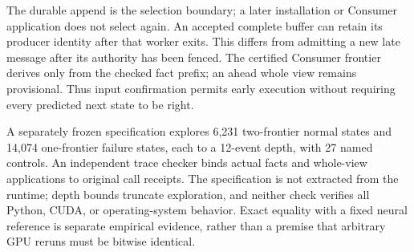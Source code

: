The durable append is the selection boundary; a later installation or
Consumer application does not select again. An accepted complete buffer
can retain its producer identity after that worker exits. This differs
from admitting a new late message after its authority has been fenced.
The certified Consumer frontier derives only from the checked fact prefix;
an ahead whole view remains provisional. Thus input confirmation permits
early execution without requiring every predicted next state to be right.

A separately frozen specification explores 6,231 two-frontier normal
states and 14,074 one-frontier failure states, each to a 12-event depth,
with 27 named controls. An independent trace checker binds actual facts
and whole-view applications to original call receipts. The specification
is not extracted from the runtime; depth bounds truncate exploration,
and neither check verifies all Python, CUDA, or operating-system behavior.
Exact equality with a fixed neural reference is separate empirical evidence,
rather than a premise that arbitrary GPU reruns must be bitwise identical.

